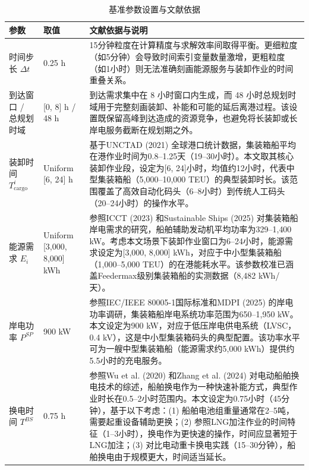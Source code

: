 \documentclass[UTF8, a4paper, 12pt]{ctexart}
\theoremstyle{plain}
\theoremstyle{definition}
\theoremstyle{remark}
\begin{document}
\begin{table}[htbp]
    \centering
    \caption{基准参数设置与文献依据}
    \label{tab:exp_params}
    \scriptsize
    \renewcommand{\arraystretch}{1.0}
    \begin{threeparttable}
    \begin{tabular}{p{3.2cm} p{2cm} p{9cm}}
        \toprule
        参数 & 取值 & 文献依据与说明 \\
        \midrule
        时间步长 $\Delta t$ & 0.25 h & 15分钟粒度在计算精度与求解效率间取得平衡。更细粒度（如5分钟）会导致时间索引变量数量激增，更粗粒度（如1小时）则无法准确刻画能源服务与装卸作业的时间重叠关系。 \\
        到达窗口 / 总规划时域 & [0, 8] h / 48 h & 到达需求集中在 8 小时窗口内生成，而 48 小时总规划时域用于完整刻画装卸、补能和可能的延后离港过程。该设置既保留高峰到达造成的资源竞争，也避免将长装卸或长岸电服务截断在规划期之外。 \\
        装卸时间 $T_{\text{cargo}}^i$ & Uniform [6, 24] h & 基于UNCTAD (2021) \cite{UNCTAD2021}全球港口统计数据，集装箱船平均在港作业时间为0.8--1.25天（19--30小时）。本文取其核心装卸作业段，设定为[6, 24]小时，均值约12小时，代表中型集装箱船（5,000--10,000 TEU）的典型装卸时长。该范围覆盖了高效自动化码头（6--8小时）到传统人工码头（20--24小时）的操作水平。 \\
        能源需求 $E_i$ & Uniform [3,000, 8,000] kWh & 参照ICCT (2023) \cite{ICCT2023}和Sustainable Ships (2025) \cite{SustainableShips2025}对集装箱船岸电需求的研究，船舶辅助发动机平均功率为329--1,400 kW。考虑本文场景下装卸作业窗口为6--24小时，能源需求设定为[3,000, 8,000] kWh，对应于中小型集装箱船（1,000--5,000 TEU）的在港能耗水平。该参数校准已涵盖Feedermax级别集装箱船的实测数据（8,482 kWh/天）。 \\
        岸电功率 $P^{SP}$ & 900 kW & 参照IEC/IEEE 80005-1国际标准\cite{IEC80005}和MDPI (2025) \cite{MDPI2025}的岸电功率调研，集装箱船岸电系统功率范围为650--1,950 kW。本文设定为900 kW，对应于低压岸电供电系统（LVSC，0.4 kV），这是中小型集装箱码头的典型配置。该功率水平可为一艘中型集装箱船（能源需求约5,000 kWh）提供约5.5小时的充电服务。 \\
        换电时间 $T^{BS}$ & 0.75 h & 参照Wu et al. (2020) \cite{Zhang2022_EShip}和Zhang et al. (2024) \cite{Zhang2024_Voyage}对电动船舶换电技术的综述，船舶换电作为一种快速补能方式，典型作业时长在0.5--2小时范围内。本文设定为0.75小时（45分钟），基于以下考虑：(1) 船舶电池组重量通常在2--5吨，需要起重设备辅助更换；(2) 参照LNG加注作业的时间特征（1--3小时）\cite{Fan2021}，换电作为更快速的操作，时间应显著短于LNG加注；(3) 对比电动重卡换电实践（15--30分钟），船舶换电由于规模更大，时间适当延长。 \\

\end{tabular}
\end{threeparttable}
\end{table}
\end{document}
